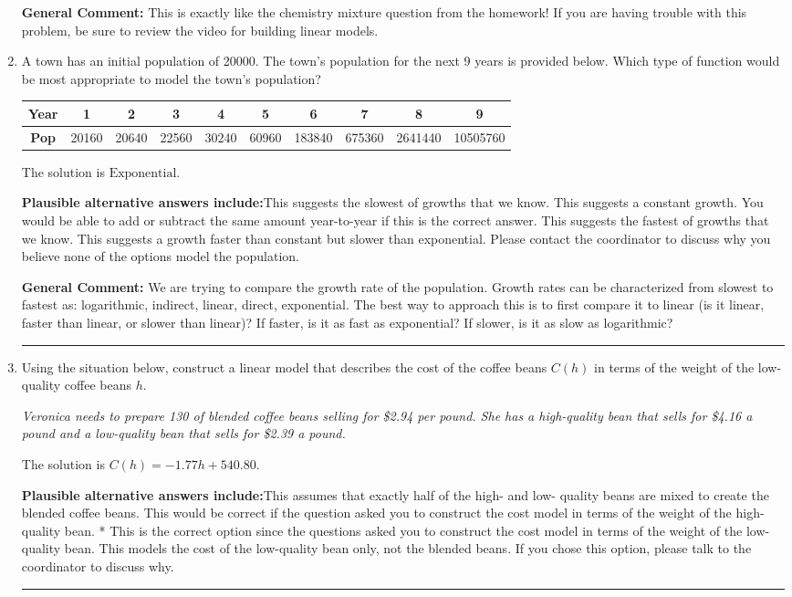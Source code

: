 \documentclass{extbook}[14pt]
\newcommand{\litem}[1]{\item #1

\rule{\textwidth}{0.4pt}}
\begin{document}
\begin{enumerate}
{\textbf{General Comment:} This is exactly like the chemistry mixture question from the homework! If you are having trouble with this problem, be sure to review the video for building linear models.
}
\litem{
A town has an initial population of 20000. The town's population for the next 9 years is provided below. Which type of function would be most appropriate to model the town's population?


\begin{tabular}{c|c|c|c|c|c|c|c|c|c}
\textbf{Year} &1 &2 &3 &4 &5 &6 &7 &8 &9\tabularnewline \hline
\textbf{Pop} &20160 &20640 &22560 &30240 &60960 &183840 &675360 &2641440 &10505760\end{tabular}The solution is \( \text{Exponential} \).\begin{enumerate}[label=\Alph*.]
\textbf{Plausible alternative answers include:}This suggests the slowest of growths that we know.
This suggests a constant growth. You would be able to add or subtract the same amount year-to-year if this is the correct answer.
This suggests the fastest of growths that we know.
This suggests a growth faster than constant but slower than exponential.
Please contact the coordinator to discuss why you believe none of the options model the population.
\end{enumerate}

\textbf{General Comment:} We are trying to compare the growth rate of the population. Growth rates can be characterized from slowest to fastest as: logarithmic, indirect, linear, direct, exponential. The best way to approach this is to first compare it to linear (is it linear, faster than linear, or slower than linear)? If faster, is it as fast as exponential? If slower, is it as slow as logarithmic?
}
\litem{
Using the situation below, construct a linear model that describes the cost of the coffee beans $C(h)$ in terms of the weight of the low-quality coffee beans $h$.

\begin{center}
    \textit{ Veronica needs to prepare 130 of blended coffee beans selling for \$2.94 per pound. She has a high-quality bean that sells for \$4.16 a pound and a low-quality bean that sells for \$2.39 a pound. }
\end{center}
The solution is \( C(h) = -1.77 h + 540.80 \).\begin{enumerate}[label=\Alph*.]
\textbf{Plausible alternative answers include:}This assumes that exactly half of the high- and low- quality beans are mixed to create the blended coffee beans.
This would be correct if the question asked you to construct the cost model in terms of the weight of the high-quality bean.
* This is the correct option since the questions asked you to construct the cost model in terms of the weight of the low-quality bean.
This models the cost of the low-quality bean only, not the blended beans.
If you chose this option, please talk to the coordinator to discuss why.
\end{enumerate}

}
\end{enumerate}
\end{document}
